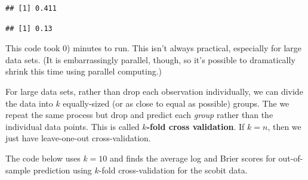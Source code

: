 \documentclass[
]{book}
\newenvironment{Shaded}{\begin{snugshade}}{\end{snugshade}}
\newcommand{\AttributeTok}[1]{\textcolor[rgb]{0.77,0.63,0.00}{#1}}
\newcommand{\CommentTok}[1]{\textcolor[rgb]{0.56,0.35,0.01}{\textit{#1}}}
\newcommand{\DecValTok}[1]{\textcolor[rgb]{0.00,0.00,0.81}{#1}}
\newcommand{\FunctionTok}[1]{\textcolor[rgb]{0.00,0.00,0.00}{#1}}
\newcommand{\NormalTok}[1]{#1}
\newcommand{\OtherTok}[1]{\textcolor[rgb]{0.56,0.35,0.01}{#1}}
\newcommand{\SpecialCharTok}[1]{\textcolor[rgb]{0.00,0.00,0.00}{#1}}
\begin{document}
\begin{Shaded}
\end{Shaded}

\begin{verbatim}
## [1] 0.411
\end{verbatim}

\begin{Shaded}
\end{Shaded}

\begin{verbatim}
## [1] 0.13
\end{verbatim}

This code took 0) minutes to run. This isn't always practical, especially for large data sets. (It is embarrassingly parallel, though, so it's possible to dramatically shrink this time using parallel computing.)

For large data sets, rather than drop each observation individually, we can divide the data into \(k\) equally-sized (or as close to equal as possible) groups. The we repeat the same process but drop and predict each \emph{group} rather than the individual data points. This is called \textbf{\(k\)-fold cross validation}. If \(k = n\), then we just have leave-one-out cross-validation.

The code below uses \(k = 10\) and finds the average log and Brier scores for out-of-sample prediction using \(k\)-fold cross-validation for the scobit data.
\end{document}
